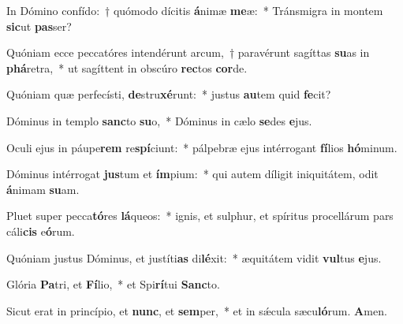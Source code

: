 \item In Dómino confído:~† quómodo dícitis \textbf{á}nimæ \textbf{me}æ:~* Tránsmigra in montem \textbf{sic}ut \textbf{pas}ser?
\item Quóniam ecce peccatóres intendérunt arcum,~† paravérunt sagíttas \textbf{su}as in \textbf{phá}retra,~* ut sagíttent in obscúro \textbf{rec}tos \textbf{cor}de.
\item Quóniam quæ perfecísti, \textbf{de}stru\textbf{xé}runt:~* justus \textbf{au}tem quid \textbf{fe}cit?
\item Dóminus in templo \textbf{sanc}to \textbf{su}o,~* Dóminus in cælo \textbf{se}des \textbf{e}jus.
\item Oculi ejus in páupe\textbf{rem} re\textbf{spí}ciunt:~* pálpebræ ejus intérrogant \textbf{fí}lios \textbf{hó}minum.
\item Dóminus intérrogat \textbf{jus}tum et \textbf{ím}pium:~* qui autem díligit iniquitátem, odit \textbf{á}nimam \textbf{su}am.
\item Pluet super pecca\textbf{tó}res \textbf{lá}queos:~* ignis, et sulphur, et spíritus procellárum pars cáli\textbf{cis} e\textbf{ó}rum.
\item Quóniam justus Dóminus, et justíti\textbf{as} di\textbf{lé}xit:~* æquitátem vidit \textbf{vul}tus \textbf{e}jus.
\item Glória \textbf{Pa}tri, et \textbf{Fí}lio,~* et Spi\textbf{rí}tui \textbf{Sanc}to.
\item Sicut erat in princípio, et \textbf{nunc}, et \textbf{sem}per,~* et in sǽcula sæcu\textbf{ló}rum. \textbf{A}men.
